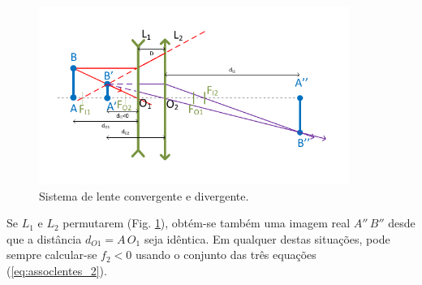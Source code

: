 \documentclass[a4paper,12pt]{article}      %
\begin{document}
\begin{figure}	[!htb]  
\begin{center}
	\includegraphics[width=0.9\textwidth]{13-DuplaConvDiv3}
\end{center}
	\caption{Sistema de lente convergente e divergente.  \label{fig:DuplaConvDiv3}} 
\end{figure}


Se $L_1$ e $L_2$ permutarem (Fig. \ref{fig:DuplaConvDiv3}), obtém-se também uma imagem real  $A''\,B''$ desde que a distância $d_{O1}=A\,O_1$ seja idêntica.
Em qualquer destas situações, pode sempre calcular-se $f_2 < 0$ usando o conjunto das três equações (\ref{eq:assoclentes_2}).
\clearpage


\end{document}
